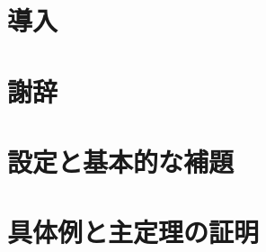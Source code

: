 \documentclass[12pt,dvipdfmx,uplatex]{jsarticle}
\begin{document}


\newgeometry{}

\makeatletter

\renewcommand*{\l@section}[2]{%
  \ifnum \c@tocdepth >\z@
    \addpenalty{\@secpenalty}%
    \addvspace{1.0em \@plus\p@}%
    \begingroup
      \parindent\z@
      \rightskip\@tocrmarg
      \parfillskip-\rightskip
      \leavevmode\headfont
      \setlength\@lnumwidth{1.5em}%
      \advance\leftskip\@lnumwidth \hskip-\leftskip
      #1\nobreak
      \leaders\hbox{\normalfont$\m@th \mkern \@dotsep mu\hbox{.}\mkern \@dotsep mu$}\hfill %
      \nobreak\hbox to\@pnumwidth{\hss#2}\par
    \endgroup
  \fi}

\makeatother


\tableofcontents

\clearpage

\section*{導入}


\section*{謝辞}

% 

\clearpage

\section{設定と基本的な補題}



\section{具体例と主定理の証明}




\begin{thebibliography}{99}
  
\end{thebibliography}
\end{document}
